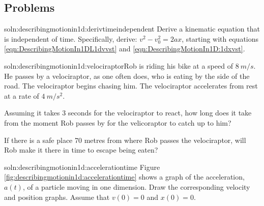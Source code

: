 \subsection{Problems}
\begin{problem}{soln:describingmotionin1d:derivtimeindependent}{
\label{prob:describingmotionin1d:derivtimeindependent} Derive a kinematic equation that is independent of time. Specifically, derive: $v^2-v_0^2=2ax$, starting with equations \ref{eqn:DescribingMotionIn1DL1dvvst} and \ref{eqn:DescribingMotionIn1D:1dxvst}.}
\end{problem}

\begin{problemParts}{soln:describingmotionin1d:velociraptor}{\label{prob:describingmotionin1d:velociraptor}Rob is riding his bike at a speed of $\SI{8}{m/s}$. He passes by a velociraptor, as one often does, who is eating by the side of the road. The velociraptor begins chasing him. The velociraptor accelerates from rest at a rate of $\SI{4}{m/s^2}$.} 
\item Assuming it takes 3 seconds for the velociraptor to react, how long does it take from the moment Rob passes by for the velicoraptor to catch up to him? 
\item If there is a safe place 70 metres from where Rob passes the velociraptor, will Rob make it there in time to escape being eaten?  
\end{problemParts}

\begin{problem}{soln:describingmotionin1d:accelerationtime} {\label{prob:describingmotionin1d:accelerationtime}Figure \ref{fig:describingmotionin1d:accelerationtime} shows a graph of the acceleration, $a(t)$, of a particle moving in one dimension. Draw the corresponding velocity and position graphs. Assume that $v(0)=0$ and $x(0)=0$.}
\end{problem}

\newpage
